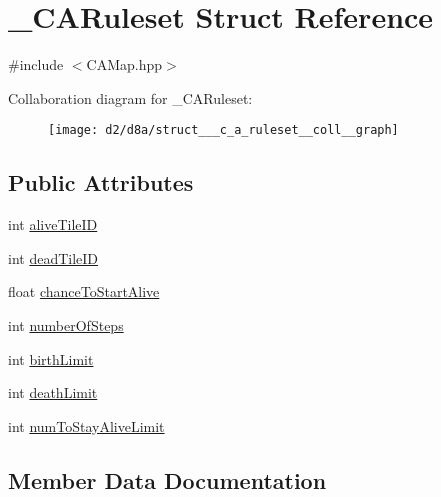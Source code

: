 \hypertarget{struct___c_a_ruleset}{}\section{\+\_\+\+C\+A\+Ruleset Struct Reference}
\label{struct___c_a_ruleset}


{\ttfamily \#include $<$C\+A\+Map.\+hpp$>$}



Collaboration diagram for \+\_\+\+C\+A\+Ruleset\+:\nopagebreak
\begin{figure}[H]
\begin{center}
\leavevmode
\texttt{[image: d2/d8a/struct\_\_\_c\_a\_ruleset\_\_coll\_\_graph]}
\end{center}
\end{figure}
\subsection*{Public Attributes}
\begin{DoxyCompactItemize}
\item 
int \mbox{\hyperlink{struct___c_a_ruleset_a337222bac7553157120b52380f58d570}{alive\+Tile\+ID}}
\item 
int \mbox{\hyperlink{struct___c_a_ruleset_a6d57373433d4eb5236bbeac8bb6f464f}{dead\+Tile\+ID}}
\item 
float \mbox{\hyperlink{struct___c_a_ruleset_afeb8028018113d49b14b5e19f7287d76}{chance\+To\+Start\+Alive}}
\item 
int \mbox{\hyperlink{struct___c_a_ruleset_ac2f4cb85d2b3e775e33eaed281a92b2d}{number\+Of\+Steps}}
\item 
int \mbox{\hyperlink{struct___c_a_ruleset_ab00fdee694e9ffe768885de7e5deb47e}{birth\+Limit}}
\item 
int \mbox{\hyperlink{struct___c_a_ruleset_a421ce30ec54473bec500e3374911637c}{death\+Limit}}
\item 
int \mbox{\hyperlink{struct___c_a_ruleset_a8af594e5e229ec31c0ef86b9bf214401}{num\+To\+Stay\+Alive\+Limit}}
\end{DoxyCompactItemize}


\subsection{Member Data Documentation}
\mbox{\label{struct___c_a_ruleset_a337222bac7553157120b52380f58d570}} 

